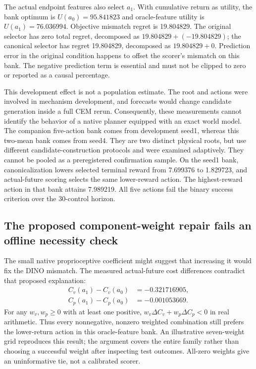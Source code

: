 \documentclass[11pt]{article}
\begin{document}
The actual endpoint features also select $a_1$. With cumulative return as
utility, the bank optimum is $U(a_0)=95.841823$ and oracle-feature utility is
$U(a_1)=76.036994$. Objective mismatch regret is 19.804829. The original
selector has zero total regret, decomposed as $19.804829+(-19.804829)$;
the canonical selector has regret 19.804829, decomposed as
$19.804829+0$. Prediction error in the original condition happens to offset
the scorer's mismatch on this bank. The negative prediction term is essential
and must not be clipped to zero or reported as a causal percentage.

This development effect is not a population estimate. The root and actions were involved
in mechanism development, and forecasts would change candidate generation
inside a full CEM rerun. Consequently, these measurements cannot identify
the behavior of a native planner equipped with an exact world model.
The companion five-action bank comes from development seed1, whereas this
two-mean bank comes from seed4. They are two distinct physical roots, but use
different candidate-construction protocols and were examined adaptively.
They cannot be pooled as a preregistered confirmation sample. On the seed1
bank, canonicalization lowers selected terminal reward from 7.699376 to
1.829723, and actual-future scoring selects the same lower-reward action.
The highest-reward action in that bank attains 7.989219. All five actions
fail the binary success criterion over the 30-control horizon.

\subsection{The proposed component-weight repair fails an offline necessity check}
The small native proprioceptive coefficient might suggest that increasing it
would fix the DINO mismatch. The measured actual-future cost differences
contradict that proposed explanation:
\begin{align}
 C_v(a_1)-C_v(a_0)&=-0.321716905,\\
 C_p(a_1)-C_p(a_0)&=-0.001053669.
\end{align}
For any $w_v,w_p\geq0$ with at least one positive,
$w_v\Delta C_v+w_p\Delta C_p<0$ in real arithmetic. Thus every nonnegative,
nonzero weighted combination still prefers the lower-return action in this
oracle-feature bank. An illustrative seven-weight grid reproduces this result;
the argument covers the entire family rather than choosing a successful
weight after inspecting test outcomes. All-zero weights give an uninformative
tie, not a calibrated scorer.
\end{document}
